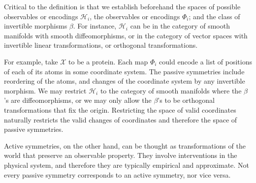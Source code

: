 \documentclass{article}
\theoremstyle{plain}
\theoremstyle{definition}
\theoremstyle{remark}
\begin{document}
Critical to the definition is that we establish beforehand the spaces of possible observables or encodings $\mathcal H_i$, the observables or encodings $\Phi_i$; and the class of invertible morphisms $\beta$. For instance, $\mathcal H_i$ can be in the category of smooth manifolds with smooth diffeomorphisms, or in the category of vector spaces with invertible linear transformations, or orthogonal transformations.   

For example, take $\mathcal X$ to be a protein. Each map $\Phi_i$ could encode a list of positions of each of its atoms in some coordinate system. The passive symmetries include reordering of the atoms, and changes of the coordinate system by any invertible morphism. We may restrict $\mathcal H_i$ to the category of smooth manifolds where the $\beta$'s are diffeomorphisms, or we may only allow the $\beta$'s to be orthogonal transformations that fix the origin. Restricting the space of valid coordinates naturally restricts the valid changes of coordinates and therefore the space of passive symmetries.

Active symmetries, on the other hand, can be thought as transformations of the world that preserve an observable property.
They involve interventions in the physical system, and therefore they are typically empirical and approximate.
Not every passive symmetry corresponds to an active symmetry, nor vice versa.
\end{document}
